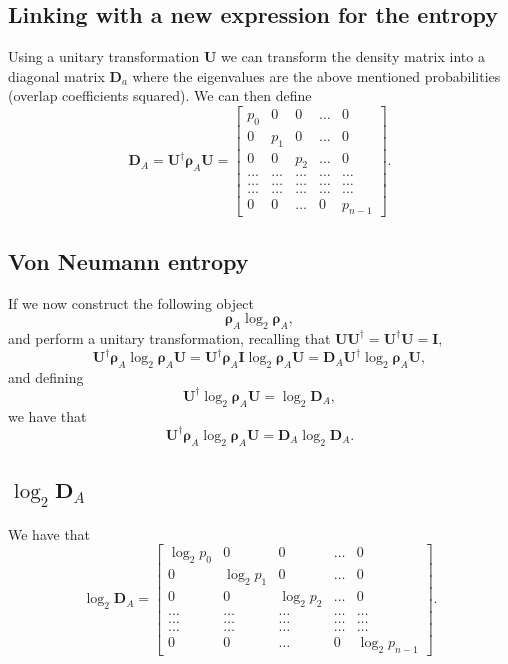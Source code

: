 \documentclass[%
oneside,                 %
final,                   %
10pt]{article}
\begin{document}
\subsection{Linking with a new expression for the entropy}

Using a unitary transformation $\bm{U}$ we can transform the density
matrix into a diagonal matrix $\bm{D}_a$ where the eigenvalues are the
above mentioned probabilities (overlap coefficients squared). We can then define
\[
\bm{D}_A=\bm{U}^{\dagger}\bm{\rho}_A\bm{U}=\begin{bmatrix} p_0 & 0 & 0 & \dots & 0\\
 0 & p_1 & 0 & \dots & 0\\
 0 & 0 & p_2 & \dots & 0\\
\dots & \dots & \dots & \dots & \dots\\
\dots & \dots & \dots & \dots & \dots\\
\dots & \dots & \dots & \dots & \dots\\
0 & 0 & \dots & 0 & p_{n-1}\end{bmatrix}.
\]

\subsection{Von Neumann entropy}

If we now construct the following object
\[
\bm{\rho}_A\log_2{\bm{\rho}_A},
\]
and perform a unitary transformation, recalling that $\bm{U}\bm{U}^{\dagger}=\bm{U}^{\dagger}\bm{U}=\bm{I}$,
\[
\bm{U}^{\dagger}\bm{\rho}_A\log_2{\bm{\rho}_A}\bm{U}=\bm{U}^{\dagger}\bm{\rho}_A\bm{I}\log_2{\bm{\rho}_A}\bm{U}=\bm{D}_A\bm{U}^{\dagger}\log_2{\bm{\rho}_A}\bm{U},
\]
and defining
\[
\bm{U}^{\dagger}\log_2{\bm{\rho}_A}\bm{U}=\log_2{\bm{D}_A},
\]
we have that 
\[
\bm{U}^{\dagger}\bm{\rho}_A\log_2{\bm{\rho}_A}\bm{U}=\bm{D}_A \log_2{\bm{D}_A}.
\]

\subsection{$\log_2{\bm{D}_A}$}

We have that
\[
\log_2{\bm{D}_A}=\begin{bmatrix} \log_2{p_0} & 0 & 0 & \dots & 0\\
 0 & \log_2{p_1} & 0 & \dots & 0\\
 0 & 0 & \log_2{p_2} & \dots & 0\\
\dots & \dots & \dots & \dots & \dots\\
\dots & \dots & \dots & \dots & \dots\\
\dots & \dots & \dots & \dots & \dots\\
0 & 0 & \dots & 0 & \log_2{p_{n-1}}\end{bmatrix}.
\]
\end{document}
